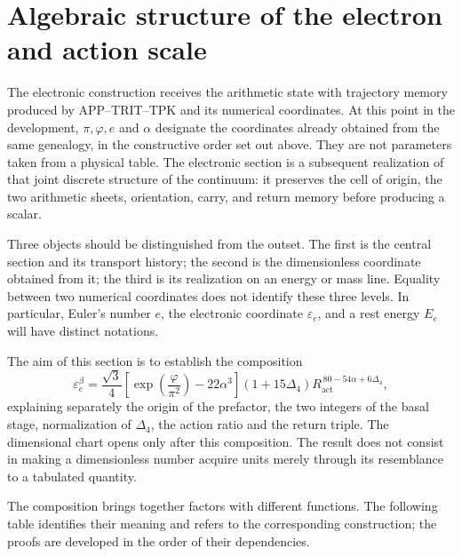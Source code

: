 \section{Algebraic structure of the electron and action scale}
\label{x_reciprocidad:sec:electron}

The electronic construction receives the arithmetic state with
trajectory memory produced by APP--TRIT--TPK and its numerical coordinates. At this point in the development,
\(\pi,\varphi,e\) and \(\alpha\) designate the coordinates already obtained from
the same genealogy, in the constructive order set out above. They
are not parameters taken from a physical table. The electronic section is a
subsequent realization of that joint discrete structure of the continuum:
it preserves the cell of origin, the two arithmetic sheets, orientation,
carry, and return memory before producing a scalar.

Three objects should be distinguished from the outset. The first is the central
section and its transport history; the second is the dimensionless
coordinate obtained from it; the third is its realization on an
energy or mass line. Equality between two numerical coordinates does not
identify these three levels. In particular, Euler's number \(e\),
the electronic coordinate \(\varepsilon_e\), and a rest energy
\(E_e\) will have distinct notations.

The aim of this section is to establish the composition
\begin{equation}
 \varepsilon_e^{\beta}
 =\frac{\sqrt3}{4}
  \left[\exp\!\left(\frac{\varphi}{\pi^2}\right)-22\alpha^3\right]
  (1+15\Delta_4)
  R_{\mathrm{act}}^{\,80-54\alpha+6\Delta_4},
 \label{x_reciprocidad:eq:el-formula-completa}
\end{equation}
explaining separately the origin of the prefactor, the two integers of the
basal stage, normalization of \(\Delta_4\), the action ratio and the
return triple. The dimensional chart opens only after
this composition. The result does not consist in making a dimensionless
number acquire units merely through its resemblance to a tabulated
quantity.

The composition brings together factors with different functions. The
following table identifies their meaning and refers to the corresponding
construction; the proofs are developed in the order of their dependencies.

